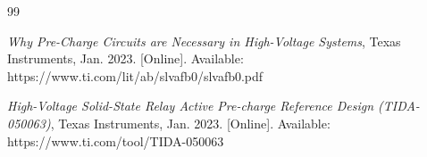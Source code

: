 \documentclass{article}
\begin{document}
\begin{thebibliography}{99}
\sloppy 

\textit{Why Pre-Charge Circuits are Necessary in High-Voltage Systems}, Texas Instruments, Jan. 2023. [Online]. 
Available: {https://www.ti.com/lit/ab/slvafb0/slvafb0.pdf}

\textit{High-Voltage Solid-State Relay Active Pre-charge Reference Design (TIDA-050063)}, Texas Instruments, Jan. 2023. [Online]. 
Available: {https://www.ti.com/tool/TIDA-050063}

\end{thebibliography}
\end{document}

